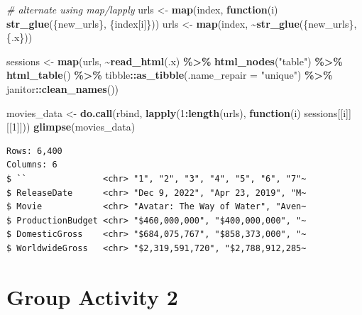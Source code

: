\documentclass[
]{book}
\newenvironment{Shaded}{\begin{snugshade}}{\end{snugshade}}
\newcommand{\AttributeTok}[1]{\textcolor[rgb]{0.13,0.29,0.53}{#1}}
\newcommand{\CommentTok}[1]{\textcolor[rgb]{0.56,0.35,0.01}{\textit{#1}}}
\newcommand{\ControlFlowTok}[1]{\textcolor[rgb]{0.13,0.29,0.53}{\textbf{#1}}}
\newcommand{\DecValTok}[1]{\textcolor[rgb]{0.00,0.00,0.81}{#1}}
\newcommand{\FunctionTok}[1]{\textcolor[rgb]{0.13,0.29,0.53}{\textbf{#1}}}
\newcommand{\NormalTok}[1]{#1}
\newcommand{\OtherTok}[1]{\textcolor[rgb]{0.56,0.35,0.01}{#1}}
\newcommand{\SpecialCharTok}[1]{\textcolor[rgb]{0.81,0.36,0.00}{\textbf{#1}}}
\newcommand{\StringTok}[1]{\textcolor[rgb]{0.31,0.60,0.02}{#1}}
\begin{document}
\begin{Shaded}
\begin{Highlighting}[]
\CommentTok{\# alternate using map/lapply}
\NormalTok{urls }\OtherTok{\textless{}{-}} \FunctionTok{map}\NormalTok{(index, }\ControlFlowTok{function}\NormalTok{(i) }\FunctionTok{str\_glue}\NormalTok{(\{new\_urls\}, \{index[i]\}))}
\NormalTok{urls }\OtherTok{\textless{}{-}} \FunctionTok{map}\NormalTok{(index, }\SpecialCharTok{\textasciitilde{}}\FunctionTok{str\_glue}\NormalTok{(\{new\_urls\}, \{.x\}))}


\NormalTok{sessions }\OtherTok{\textless{}{-}} \FunctionTok{map}\NormalTok{(urls, }\SpecialCharTok{\textasciitilde{}}\FunctionTok{read\_html}\NormalTok{(.x) }\SpecialCharTok{\%\textgreater{}\%} 
                  \FunctionTok{html\_nodes}\NormalTok{(}\StringTok{"table"}\NormalTok{) }\SpecialCharTok{\%\textgreater{}\%} 
                  \FunctionTok{html\_table}\NormalTok{() }\SpecialCharTok{\%\textgreater{}\%} 
\NormalTok{                  tibble}\SpecialCharTok{::}\FunctionTok{as\_tibble}\NormalTok{(}\AttributeTok{.name\_repair =} \StringTok{"unique"}\NormalTok{) }\SpecialCharTok{\%\textgreater{}\%} 
\NormalTok{                  janitor}\SpecialCharTok{::}\FunctionTok{clean\_names}\NormalTok{())}

\NormalTok{movies\_data }\OtherTok{\textless{}{-}} \FunctionTok{do.call}\NormalTok{(rbind, }\FunctionTok{lapply}\NormalTok{(}\DecValTok{1}\SpecialCharTok{:}\FunctionTok{length}\NormalTok{(urls), }\ControlFlowTok{function}\NormalTok{(i) sessions[[i]][[}\DecValTok{1}\NormalTok{]]))}
\FunctionTok{glimpse}\NormalTok{(movies\_data)}
\end{Highlighting}
\end{Shaded}

\begin{verbatim}
Rows: 6,400
Columns: 6
$ ``               <chr> "1", "2", "3", "4", "5", "6", "7"~
$ ReleaseDate      <chr> "Dec 9, 2022", "Apr 23, 2019", "M~
$ Movie            <chr> "Avatar: The Way of Water", "Aven~
$ ProductionBudget <chr> "$460,000,000", "$400,000,000", "~
$ DomesticGross    <chr> "$684,075,767", "$858,373,000", "~
$ WorldwideGross   <chr> "$2,319,591,720", "$2,788,912,285~
\end{verbatim}

\hypertarget{group-activity-2-4}{%
\section{Group Activity 2}\label{group-activity-2-4}}
\end{document}
